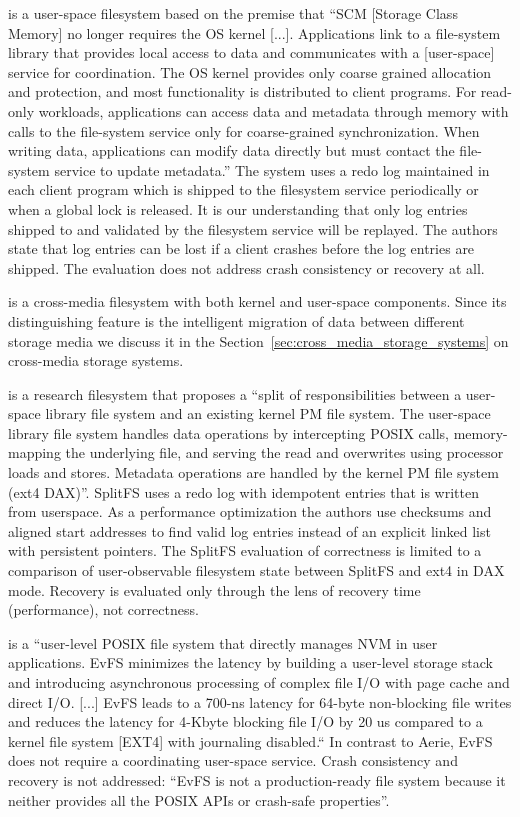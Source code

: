 \documentclass[12pt,a4paper,twoside]{book}
\begin{document}
 is a user-space filesystem based on the premise that
“SCM [Storage Class Memory] no longer requires the OS kernel [...].
Applications link to a file-system library that provides local access to data and communicates with a [user-space] service for coordination.
The OS kernel provides only coarse grained allocation and protection, and most functionality is distributed to client programs.
For read-only workloads, applications can access data and metadata through memory with calls to the file-system service only for coarse-grained synchronization.
When writing data, applications can modify data directly but must contact the file-system service to update metadata.”
The system uses a redo log maintained in each client program which is shipped to the filesystem service periodically or when a global lock is released.
It is our understanding that only log entries shipped to and validated by the filesystem service will be replayed.
The authors state that log entries can be lost if a client crashes before the log entries are shipped.
The evaluation does not address crash consistency or recovery at all.

 is a cross-media filesystem with both kernel and user-space components.
Since its distinguishing feature is the intelligent migration of data between different storage media we discuss it in the Section~\ref{sec:cross_media_storage_systems} on cross-media storage systems.

 is a research filesystem that proposes a
“split of responsibilities between a user-space library file system and an existing kernel PM file system.
The user-space library file system handles data operations by intercepting POSIX calls, memory-mapping the underlying file, and serving the read and overwrites using processor loads and stores.
Metadata operations are handled by the kernel PM file system (ext4 DAX)”.
SplitFS uses a redo log with idempotent entries that is written from userspace.
As a performance optimization the authors use checksums and aligned start addresses to find valid log entries instead of an explicit linked list with persistent pointers.
The SplitFS evaluation of correctness is limited to a comparison of user-observable filesystem state between SplitFS and ext4 in DAX mode.
Recovery is evaluated only through the lens of recovery time (performance), not correctness.

 is a
“user-level POSIX file system that directly manages NVM in user applications.
EvFS minimizes the latency by building a user-level storage stack and introducing asynchronous processing of complex file I/O with page cache and direct I/O.
[...]
EvFS leads to a 700-ns latency for 64-byte non-blocking file writes and reduces the latency for 4-Kbyte blocking file I/O by 20 us compared to a kernel file system [EXT4] with journaling disabled.“
In contrast to Aerie, EvFS does not require a coordinating user-space service.
Crash consistency and recovery is not addressed:
“EvFS is not a production-ready file system because it neither provides all the POSIX APIs or crash-safe properties”.
\end{document}
